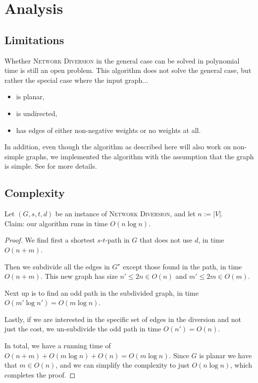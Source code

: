 \section{Analysis}

\subsection{Limitations}
Whether \textsc{Network Diversion} in the general case can be solved in polynomial time is still an open problem.
This algorithm does not solve the general case, but rather the special case where the input graph...
\begin{itemize}
    \item is planar,
    \item is undirected,
    \item has edges of either non-negative weights or no weights at all.
\end{itemize}

In addition, even though the algorithm as described here will also work on non-simple graphs, we implemented the algorithm with the assumption that the graph is simple. See  for more details. 

\subsection{Complexity}
Let $(G, s, t, d)$ be an instance of \textsc{Network Diversion}, and let $n := |V|$. \\
Claim: our algorithm runs in time $O(n \log n)$.

\begin{proof}
    We find first a shortest $s$-$t$-path in $G$ that does not use $d$, in time $O(n+m)$.

    Then we subdivide all the edges in $G^\star$ except those found in the path, in time $O(n+m)$. This new graph has size $n' \leq 2n \in O(n)$ and $m' \leq 2m \in O(m)$.

    Next up is to find an odd path in the subdivided graph, in time $O(m' \log n') = O(m \log n)$.

    Lastly, if we are interested in the specific set of edges in the diversion and not just the cost, we un-subdivide the odd path in time $O(n') = O(n)$.

    In total, we have a running time of $O(n+m) + O(m \log n) + O(n) = O(m \log n)$. Since $G$ is planar we have that $m \in O(n)$, and we can simplify the complexity to just $O(n \log n)$, which completes the proof.
\end{proof}

